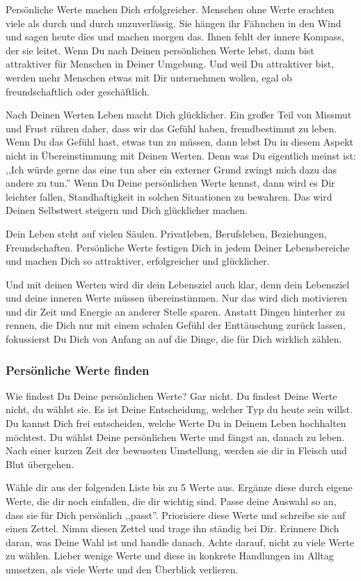 \documentclass[../Lebensziel.tex]{subfiles}
\begin{document}
Persönliche Werte machen Dich erfolgreicher. Menschen ohne Werte erachten viele als durch und durch unzuverlässig. Sie hängen ihr Fähnchen in den Wind und sagen heute dies und machen morgen das. Ihnen fehlt der innere Kompass, der sie leitet. Wenn Du nach Deinen persönlichen Werte lebst, dann bist attraktiver für Menschen in Deiner Umgebung. Und weil Du attraktiver bist, werden mehr Menschen etwas mit Dir unternehmen wollen, egal ob freundschaftlich oder geschäftlich.

Nach Deinen Werten Leben macht Dich glücklicher. Ein großer Teil von Missmut und Frust rühren daher, dass wir das Gefühl haben, fremdbestimmt zu leben. Wenn Du das Gefühl hast, etwas tun zu müssen, dann lebst Du in diesem Aspekt nicht in Übereinstimmung mit Deinen Werten. Denn was Du eigentlich meinst ist: ,,Ich würde gerne das eine tun aber ein externer Grund zwingt mich dazu das andere zu tun.''
Wenn Du Deine persönlichen Werte kennst, dann wird es Dir leichter fallen, Standhaftigkeit in solchen Situationen zu bewahren. Das wird Deinen Selbstwert steigern und Dich glücklicher machen.

Dein Leben steht auf vielen Säulen. Privatleben, Berufsleben, Beziehungen, Freundschaften. Persönliche Werte festigen Dich in jedem Deiner Lebensbereiche und machen Dich so attraktiver, erfolgreicher und glücklicher.

Und mit deinen Werten wird dir dein Lebensziel auch klar, denn dein Lebensziel und deine inneren Werte müssen übereinstimmen. Nur das wird dich motivieren und dir Zeit und Energie an anderer Stelle sparen. Anstatt Dingen hinterher zu rennen, die Dich nur mit einem schalen Gefühl der Enttäuschung zurück lassen, fokussierst Du Dich von Anfang an auf die Dinge, die für Dich wirklich zählen.

\subsubsection{Persönliche Werte finden}
Wie findest Du Deine persönlichen Werte? Gar nicht. Du findest Deine Werte nicht, du wählst sie. Es ist Deine Entscheidung, welcher Typ du heute sein willst. Du kannst Dich frei entscheiden, welche Werte Du in Deinem Leben hochhalten möchtest. Du wählst Deine persönlichen Werte und fängst an, danach zu leben. Nach einer kurzen Zeit der bewussten Umstellung, werden sie dir in Fleisch und Blut übergehen.

Wähle dir aus der folgenden Liste bis zu 5 Werte aus. Ergänze diese durch eigene Werte, die dir noch einfallen, die dir wichtig sind. Passe deine Auswahl so an, dass sie für Dich persönlich ,,passt''. Priorisiere diese Werte und schreibe sie auf einen Zettel. Nimm diesen Zettel und trage ihn ständig bei Dir. Erinnere Dich daran, was Deine Wahl ist und handle danach. Achte darauf, nicht zu viele Werte zu wählen. Lieber wenige Werte und diese in konkrete Handlungen im Alltag umsetzen, als viele Werte und den Überblick verlieren.
\end{document}
